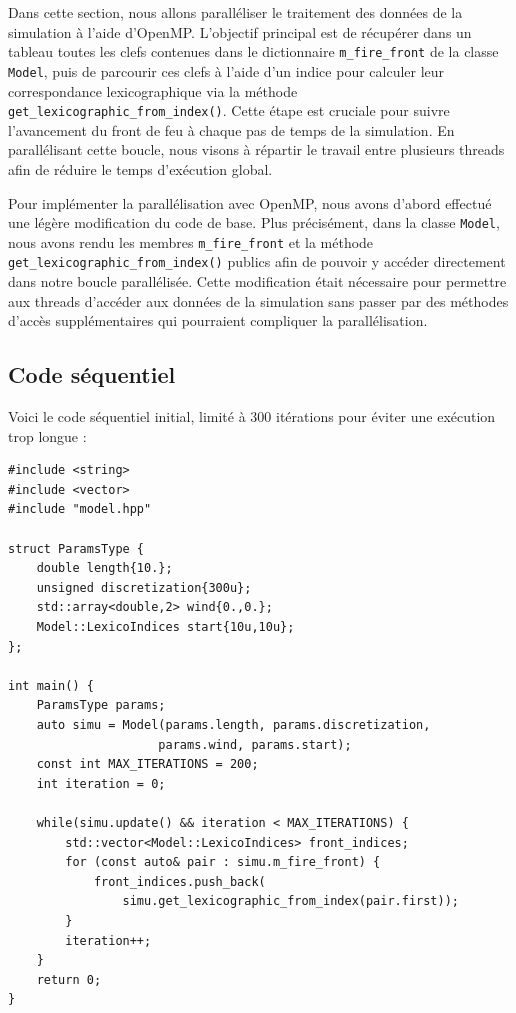 \documentclass[a4paper,12pt]{article}
\begin{document}
Dans cette section, nous allons paralléliser le traitement des données de la simulation à l'aide d'OpenMP. L'objectif principal est de récupérer dans un tableau toutes les clefs contenues dans le dictionnaire \texttt{m\_fire\_front} de la classe \texttt{Model}, puis de parcourir ces clefs à l'aide d'un indice pour calculer leur correspondance lexicographique via la méthode \texttt{get\_lexicographic\_from\_index()}. Cette étape est cruciale pour suivre l'avancement du front de feu à chaque pas de temps de la simulation. En parallélisant cette boucle, nous visons à répartir le travail entre plusieurs threads afin de réduire le temps d'exécution global.

Pour implémenter la parallélisation avec OpenMP, nous avons d'abord effectué une légère modification du code de base. Plus précisément, dans la classe \texttt{Model}, nous avons rendu les membres \texttt{m\_fire\_front} et la méthode \texttt{get\_lexicographic\_from\_index()} publics afin de pouvoir y accéder directement dans notre boucle parallélisée. Cette modification était nécessaire pour permettre aux threads d'accéder aux données de la simulation sans passer par des méthodes d'accès supplémentaires qui pourraient compliquer la parallélisation.

\subsection{Code séquentiel}
Voici le code séquentiel initial, limité à 300 itérations pour éviter une exécution trop longue :

\begin{lstlisting}
#include <string>
#include <vector>
#include "model.hpp"

struct ParamsType {
    double length{10.};
    unsigned discretization{300u};
    std::array<double,2> wind{0.,0.};
    Model::LexicoIndices start{10u,10u};
};

int main() {
    ParamsType params;
    auto simu = Model(params.length, params.discretization, 
                     params.wind, params.start);
    const int MAX_ITERATIONS = 200;
    int iteration = 0;
    
    while(simu.update() && iteration < MAX_ITERATIONS) {
        std::vector<Model::LexicoIndices> front_indices;
        for (const auto& pair : simu.m_fire_front) {
            front_indices.push_back(
                simu.get_lexicographic_from_index(pair.first));
        }
        iteration++;
    }
    return 0;
}
\end{lstlisting}
\end{document}
